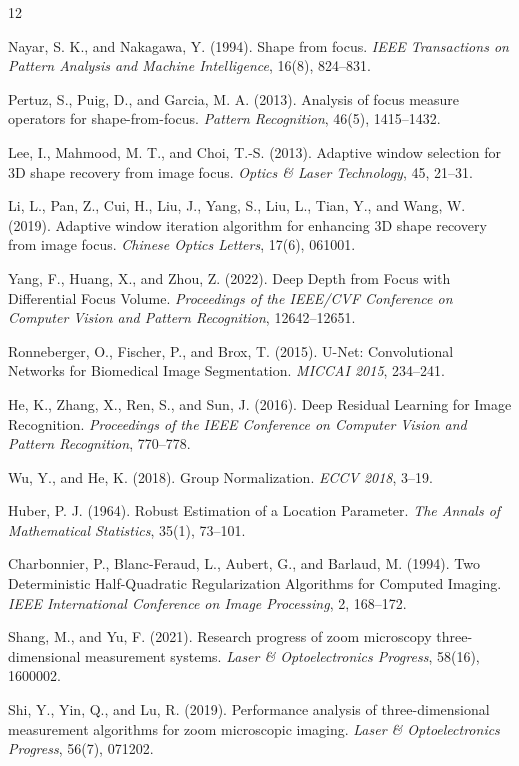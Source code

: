 \documentclass[11pt,a4paper]{article}
\begin{document}
\begin{thebibliography}{12}

Nayar, S. K., and Nakagawa, Y. (1994). Shape from focus. \textit{IEEE Transactions on Pattern Analysis and Machine Intelligence}, 16(8), 824--831.

Pertuz, S., Puig, D., and Garcia, M. A. (2013). Analysis of focus measure operators for shape-from-focus. \textit{Pattern Recognition}, 46(5), 1415--1432.

Lee, I., Mahmood, M. T., and Choi, T.-S. (2013). Adaptive window selection for 3D shape recovery from image focus. \textit{Optics \& Laser Technology}, 45, 21--31.

Li, L., Pan, Z., Cui, H., Liu, J., Yang, S., Liu, L., Tian, Y., and Wang, W. (2019). Adaptive window iteration algorithm for enhancing 3D shape recovery from image focus. \textit{Chinese Optics Letters}, 17(6), 061001.

Yang, F., Huang, X., and Zhou, Z. (2022). Deep Depth from Focus with Differential Focus Volume. \textit{Proceedings of the IEEE/CVF Conference on Computer Vision and Pattern Recognition}, 12642--12651.

Ronneberger, O., Fischer, P., and Brox, T. (2015). U-Net: Convolutional Networks for Biomedical Image Segmentation. \textit{MICCAI 2015}, 234--241.

He, K., Zhang, X., Ren, S., and Sun, J. (2016). Deep Residual Learning for Image Recognition. \textit{Proceedings of the IEEE Conference on Computer Vision and Pattern Recognition}, 770--778.

Wu, Y., and He, K. (2018). Group Normalization. \textit{ECCV 2018}, 3--19.

Huber, P. J. (1964). Robust Estimation of a Location Parameter. \textit{The Annals of Mathematical Statistics}, 35(1), 73--101.

Charbonnier, P., Blanc-Feraud, L., Aubert, G., and Barlaud, M. (1994). Two Deterministic Half-Quadratic Regularization Algorithms for Computed Imaging. \textit{IEEE International Conference on Image Processing}, 2, 168--172.

Shang, M., and Yu, F. (2021). Research progress of zoom microscopy three-dimensional measurement systems. \textit{Laser \& Optoelectronics Progress}, 58(16), 1600002.

Shi, Y., Yin, Q., and Lu, R. (2019). Performance analysis of three-dimensional measurement algorithms for zoom microscopic imaging. \textit{Laser \& Optoelectronics Progress}, 56(7), 071202.

\end{thebibliography}
\end{document}
